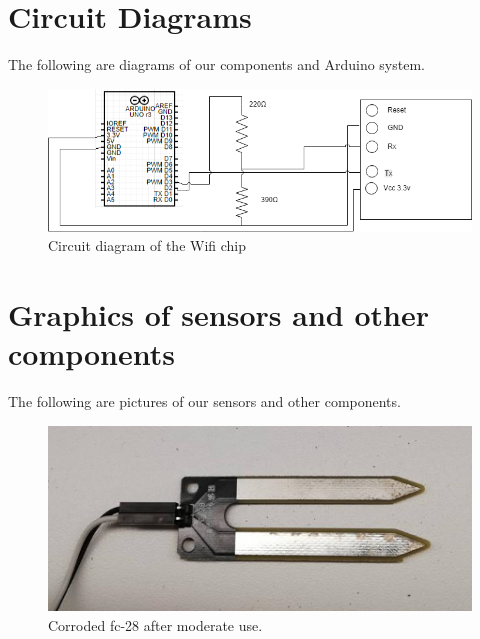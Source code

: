 \documentclass[a4paper,12pt,twoside,openright,titlepage]{book}
\begin{document}
\chapter{Circuit Diagrams}
The following are diagrams of our components and Arduino system.
\begin{figure}[!ht]
  \centering
      \includegraphics[scale=0.8]{Circuit-Diagram-Wifi-8266}
  \caption{Circuit diagram of the Wifi chip}
  \label{fig:Wifi Circuit}
\end{figure}


\chapter{Graphics of sensors and other components}
The following are pictures of our sensors and other components.

\begin{figure}[!ht]
  \centering
      \includegraphics{fc-28-corrosion}
  \caption{Corroded fc-28 after moderate use.}
  \label{fig:resistive}
\end{figure}
\end{document}
